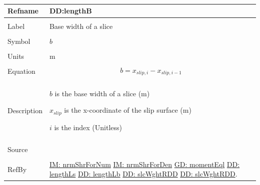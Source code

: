 \documentclass[12pt]{article}
\begin{document}
\par~

\noindent \begin{minipage}{\textwidth}
\begin{tabular}{p{} p{}}
\toprule \textbf{Refname} & \textbf{DD:lengthB}
\label{DD:lengthB}
\\ \midrule \\
Label & Base width of a slice
        \\ \midrule \\
        Symbol & $b$
                 \\ \midrule \\
                 Units & m
                         \\ \midrule \\
                         Equation & \begin{displaymath}
                                    b={x_{slip,i}}-{x_{slip,i-1}}
                                    \end{displaymath}
                                    \\ \midrule \\
                                    Description & \begin{symbDescription}
                                                  \item{$b$ is the base width of a slice (m)}
                                                  \item{${x_{slip}}$ is the x-coordinate of the slip surface (m)}
                                                  \item{$i$ is the index (Unitless)}
                                                  \end{symbDescription}
                                                  \\ \midrule \\
                                                  Source & \cite{fredlund1977}
                                                           \\ \midrule \\
                                                           RefBy & \hyperref[IM:nrmShrForNum]{IM: nrmShrForNum} \hyperref[IM:nrmShrForDen]{IM: nrmShrForDen} \hyperref[GD:momentEql]{GD: momentEql} \hyperref[DD:lengthLs]{DD: lengthLs} \hyperref[DD:lengthLb]{DD: lengthLb} \hyperref[DD:slcWghtRDD]{DD: slcWghtRDD} \hyperref[DD:slcWghtRDD]{DD: slcWghtRDD}.
\\ \bottomrule \end{tabular}
\end{minipage}
\par~
\end{document}
